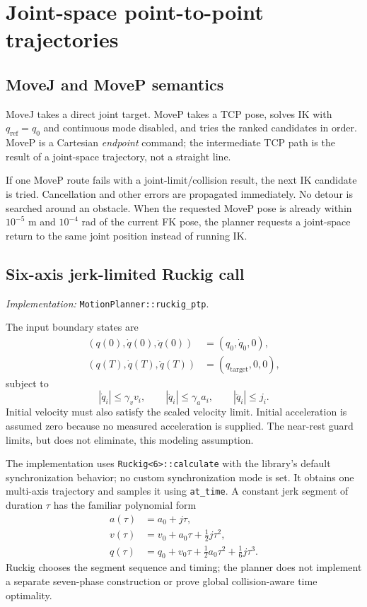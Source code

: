 \documentclass[11pt,a4paper]{report}
\newcommand{\file}[1]{\nolinkurl{#1}}
\newcommand{\src}[1]{\textit{Implementation:} \file{#1}.}
\begin{document}
\section{Joint-space point-to-point trajectories}
\subsection{MoveJ and MoveP semantics}
MoveJ takes a direct joint target. MoveP takes a TCP pose, solves IK with
$q_{\mathrm{ref}}=q_0$ and continuous mode disabled, and tries the ranked
candidates in order. MoveP is a Cartesian \emph{endpoint} command; the
intermediate TCP path is the result of a joint-space trajectory, not a
straight line.

If one MoveP route fails with a joint-limit/collision result, the next IK
candidate is tried. Cancellation and other errors are propagated immediately.
No detour is searched around an obstacle. When the requested MoveP pose is
already within $10^{-5}$ m and $10^{-4}$ rad of the current FK pose, the
planner requests a joint-space return to the same joint position instead of
running IK.

\subsection{Six-axis jerk-limited Ruckig call}
\src{MotionPlanner::ruckig_ptp}

The input boundary states are
\begin{align}
 (q(0),\dot q(0),\ddot q(0))&=(q_0,\dot q_0,0),\\
 (q(T),\dot q(T),\ddot q(T))&=(q_{\mathrm{target}},0,0),
\end{align}
subject to
\begin{equation}
 |\dot q_i|\le\gamma_v v_i,\qquad
 |\ddot q_i|\le\gamma_a a_i,\qquad
 |\dddot q_i|\le j_i.
\end{equation}
Initial velocity must also satisfy the scaled velocity limit. Initial
acceleration is assumed zero because no measured acceleration is supplied.
The near-rest guard limits, but does not eliminate, this modeling assumption.

The implementation uses \file{Ruckig<6>::calculate} with the library's default
synchronization behavior; no custom synchronization mode is set. It obtains
one multi-axis trajectory and samples it using \file{at_time}. A constant
jerk segment of duration $\tau$ has the familiar polynomial form
\begin{align}
 a(\tau)&=a_0+j\tau,\\
 v(\tau)&=v_0+a_0\tau+\tfrac12j\tau^2,\\
 q(\tau)&=q_0+v_0\tau+\tfrac12a_0\tau^2+\tfrac16j\tau^3.
\end{align}
Ruckig chooses the segment sequence and timing; the planner does not
implement a separate seven-phase construction or prove global collision-aware
time optimality.
\end{document}
